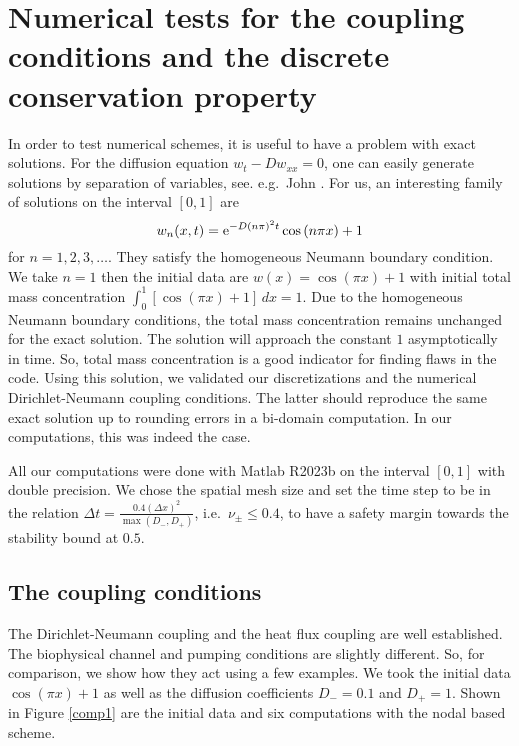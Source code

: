 %
%
\section{Numerical tests for the coupling conditions and the discrete conservation property}
\label{sec:tests}
%
%

In order to test numerical schemes, it is useful to have a problem with exact solutions. 
For the diffusion equation $w_t-Dw_{xx} =0$, one can easily generate solutions
by separation of variables, see. e.g.\ John \cite[Section 7.1]{bJOH}.
For us, an interesting family of solutions on the interval $[0,1]$ are
%
$$
w_n(x,t)=\text{e}^{-D(n\pi)^2 t}\cos \left(n\pi x\right)+1
$$
%
for $n=1,2,3,\ldots$. They satisfy the homogeneous Neumann boundary
condition. We take $n=1$ then the initial data are $w(x)=\cos \left(\pi x\right)+1$ 
with initial total mass concentration $\int_{0}^{1} [\cos(\pi x)+1] \,dx=1$.
Due to the homogeneous Neumann boundary conditions, the total mass concentration 
remains unchanged for the exact solution. 
The solution will approach the constant $1$ asymptotically in time. So, 
total mass concentration is a good indicator for finding flaws in the code.
Using this solution, we validated our discretizations and the numerical Dirichlet-Neumann coupling conditions. 
The latter should reproduce the same exact solution up to rounding errors in a bi-domain computation. 
In our computations, this was indeed the case.

All our computations were done with {\sc Matlab} R2023b on the interval $[0,1]$ with double precision. 
We chose the spatial mesh size and set the time step to be in the relation
$\Delta t =\frac{0.4(\Delta x)^2}{\max (D_-,D_+)}$, i.e.\ $\nu_\pm\le 0.4$, 
to have a safety margin towards the stability bound at $0.5$.

%
%
\subsection{The coupling conditions}
%
%

The Dirichlet-Neumann coupling and the heat flux coupling are well established. 
The biophysical channel and pumping conditions are slightly
different. So, for comparison, we show how they act using a few examples.
We took the initial data $\cos(\pi x)+1$ as well as the diffusion coefficients $D_-=0.1$ and $D_+=1$.
Shown in Figure \ref{comp1} are the initial data and
six computations with the nodal based scheme. 

